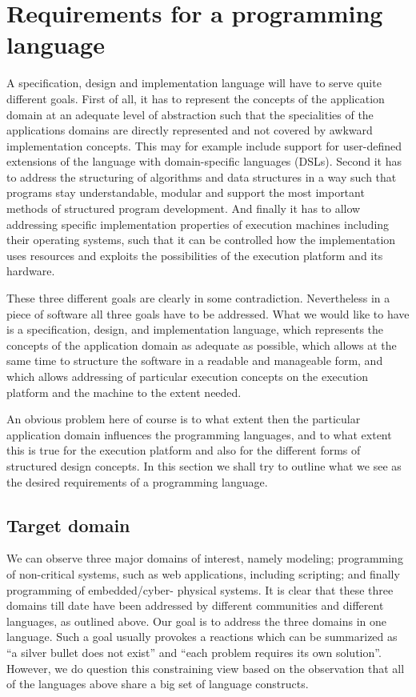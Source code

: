 

\section{Requirements for a programming language}

A specification, design and implementation language will have to 
serve quite different goals. First of all, it has to represent the 
concepts of the application domain at an adequate level of 
abstraction such that the specialities of the applications domains 
are directly represented and not covered by awkward implementation 
concepts. This may for example include support for user-defined 
extensions of the language with domain-specific languages (DSLs). 
Second it has to address the structuring of algorithms and data 
structures in a way such that programs stay understandable, modular 
and support the most important methods of structured program 
development. And finally it has to allow addressing specific 
implementation properties of execution machines including their 
operating systems, such that it can be controlled how the 
implementation uses resources and exploits the possibilities of the 
execution platform and its hardware. 

These three different goals are clearly in some contradiction. 
Nevertheless in a piece of software all three goals have to be 
addressed. What we would like to have is a specification, design, 
and implementation language, which represents the concepts of the 
application domain as adequate as possible, which allows at the 
same time to structure the software in a readable and manageable 
form, and which allows addressing of particular execution concepts 
on the execution platform and the machine to the extent needed. 

An obvious problem here of course is to what extent then the 
particular application domain influences the programming languages, 
and to what extent this is true for the execution platform and also 
for the different forms of structured design concepts. In this 
section we shall try to outline what we see as the desired 
requirements of a programming language. 


\subsection{Target domain}

We can observe three major domains of interest, namely modeling; 
programming of non-critical systems, such as web applications, 
including scripting; and finally programming of embedded/cyber-
physical systems. It is clear that these three domains till date 
have been addressed by different communities and different 
languages, as outlined above. Our goal is to address the three 
domains in one language. Such a goal usually provokes a reactions 
which can be summarized as
“a silver bullet does not exist” and “each problem requires its own 
solution”. However, we do question this constraining view based on 
the observation that all of the languages above share a big set of 
language constructs.

